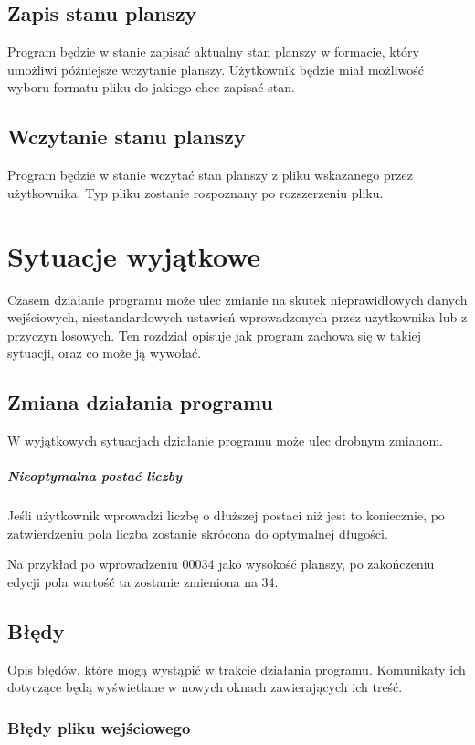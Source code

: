 \documentclass{report}
\begin{document}
\section{Zapis stanu planszy}
Program będzie w stanie zapisać aktualny stan planszy w formacie, który umożliwi późniejsze wczytanie planszy. Użytkownik będzie miał możliwość wyboru formatu pliku do jakiego chce zapisać stan.

\section{Wczytanie stanu planszy}
Program będzie w stanie wczytać stan planszy z pliku wskazanego przez użytkownika. Typ pliku zostanie rozpoznany po rozszerzeniu pliku.

\chapter{Sytuacje wyjątkowe}
Czasem działanie programu może ulec zmianie na skutek nieprawidłowych danych wejściowych, niestandardowych ustawień wprowadzonych przez użytkownika lub z przyczyn losowych. Ten rozdział opisuje jak program zachowa się w takiej sytuacji, oraz co może ją wywołać.

\section{Zmiana działania programu}
W wyjątkowych sytuacjach działanie programu może ulec drobnym zmianom.

\paragraph{Nieoptymalna postać liczby}
Jeśli użytkownik wprowadzi liczbę o dłuższej postaci niż jest to koniecznie, po zatwierdzeniu pola liczba zostanie skrócona do optymalnej długości.

Na przykład po wprowadzeniu 00034 jako wysokość planszy, po zakończeniu edycji pola wartość ta zostanie zmieniona na 34.

\section{Błędy}
Opis błędów, które mogą wystąpić w trakcie działania programu. Komunikaty ich dotyczące będą wyświetlane w nowych oknach zawierających ich treść.

\subsection{Błędy pliku wejściowego}
\end{document}
